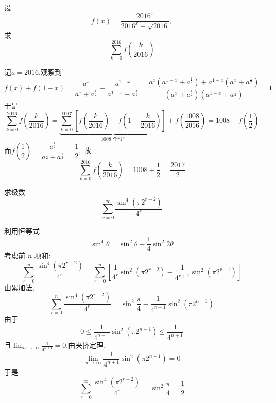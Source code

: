 \begin{questions}
    \question 设
    \[
    f(x) = \frac{2016^x}{2016^x + \sqrt{2016}},
    \]
    求
    \[
    \sum_{k=0}^{2016} f\left(\frac{k}{2016}\right) 
    \]
    \begin{solution}
        记$a=2016$,观察到
        \[
        f(x)+f(1-x)=\frac{a^{x}}{a^{x}+a^\frac12}+\frac{a^{1-x}}{a^{1-x}+a^\frac12}
        =\frac{a^{x}(a^{1-x}+a^{\frac12})+a^{1-x}(a^{x}+a^\frac12)}{(a^{x}+a^\frac12)(a^{1-x}+a^\frac12)}=1
        \]
        于是
        \[
        \sum_{k=0}^{2016} f\!\left(\frac{k}{2016}\right)
        =\underbrace{\sum_{k=0}^{1007}\left[f\!\left(\frac{k}{2016}\right)+f\!\left(1-\frac{k}{2016}\right)\right]}_{1008\text{ 个“1”}}+f\!\left(\frac{1008}{2016}\right)
        =1008+f\!\left(\frac12\right)
        \]
        而$f\!\left(\dfrac12\right)=\dfrac{a^\frac12}{a^\frac12+a^\frac12}=\dfrac12,$ 故
        \[
        \sum_{k=0}^{2016} f\!\left(\frac{k}{2016}\right)=1008+\frac12=\frac{2017}{2}
        \]
    \end{solution}

    \question 求级数
    \[
    \sum_{r=0}^{\infty}\frac{\sin^4(\pi 2^{r-2})}{4^r}
    \]
    \begin{solution}
        利用恒等式
        \[
        \sin^4\theta=\sin^2\theta-\frac{1}{4}\sin^2 2\theta
        \]
        考虑前 $n$ 项和:
        \[
        \sum_{r=0}^{n}\frac{\sin^4(\pi  2^{r-2})}{4^r}
        =\sum_{r=0}^{n}\left[
        \frac{1}{4^r}\sin^2(\pi 2^{r-2})
        -\frac{1}{4^{r+1}}\sin^2(\pi 2^{r-1})
        \right]
        \]
        由累加法,
        \[
        \sum_{r=0}^{n}\frac{\sin^4(\pi 2^{r-2})}{4^r}
        = \sin^2\frac{\pi }{4}
        -\frac{1}{4^{n+1}}\sin^2(\pi 2^{n-1})
        \]
        由于
        \[
        0\le \frac{1}{4^{n+1}}\sin^2(\pi 2^{n-1}) \le \frac{1}{4^{n+1}}
        \]
        且$\lim_{n \to \infty} \frac{1}{4^{n+1}}=0$,由夹挤定理,
        \[
        \lim_{n \to \infty} \frac{1}{4^{n+1}}\sin^2(\pi 2^{n-1}) = 0
        \]
        于是
        \[
        \sum_{r=0}^{\infty}\frac{\sin^4(\pi 2^{r-2})}{4^r}= \sin^2\frac{\pi}{4}= \frac{1}{2}
        \]
    \end{solution}


\end{questions}

